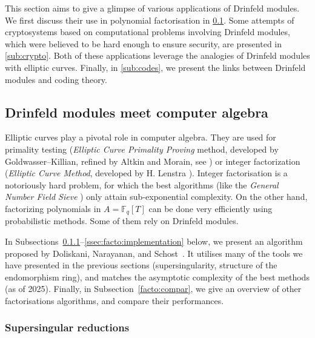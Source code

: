 \documentclass[11pt]{article}
\theoremstyle{definition}
\newcommand\Fq{\mathbb{F}_q}
\begin{document}
\label{sec:applications}

This section aims to give a glimpse of various applications of Drinfeld modules. We first discuss their use in polynomial factorisation in \cref{sub:facto}.  Some attempts of cryptosystems based on computational problems involving Drinfeld modules, which were believed to be hard enough to ensure security, are presented in \cref{sub:crypto}. Both of these applications leverage the analogies of Drinfeld modules with elliptic curves. Finally, in \cref{sub:codes}, we present the links between Drinfeld modules and coding theory.
    
\subsection{Drinfeld modules meet computer algebra}
\label{sub:facto}

Elliptic curves play a pivotal role in computer algebra. They are used for
primality testing (\emph{Elliptic Curve Primality Proving} method, developed by
Goldwasser--Killian, refined by Altkin and Morain, see
\cite{goldwasser_almost_1986, atkin_elliptic_1993}) or integer factorization
(\emph{Elliptic Curve Method}, developed by H. Lenstra
\cite{lenstra_factoring_1987}). Integer factorisation is a notoriously hard
problem, for which the best algorithms (like the \emph{General Number Field
Sieve} \cite{lenstra_factoring_1987}) only attain sub-exponential complexity.
On the other hand, factorizing polynomials in $A=\Fq[T]$ can be done very efficiently
using probabilistic methods. Some of them rely on Drinfeld modules.

In Subsections~\ref{ssec:facto:supersingular}--\ref{ssec:facto:implementation} below, we present an algorithm proposed by Doliskani, Narayanan, and Schost~\cite{doliskani_drinfeld_2021}.
It utilises many of the tools we have presented in the previous sections (supersingularity,
structure of the endomorphism ring), and matches the asymptotic complexity of the best methods
(as of 2025).
Finally, in Subsection~\ref{facto:compar}, we give an overview of other factorisations
algorithms, and compare their performances.

\subsubsection{Supersingular reductions}
\label{ssec:facto:supersingular}
\end{document}
